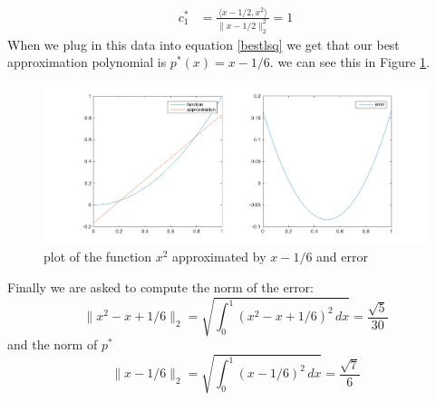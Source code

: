 \begin{solution}
\begin{align*}
c_1^* &= \frac{\langle x-1/2, x^2 \rangle}{\lVert x-1/2\rVert_2^2} = 1
\end{align*}
When we plug in this data into equation \ref{bestlsq} we get that our best approximation polynomial is $p^*(x) = x-1/6$. we can see this in Figure \ref{bestlsqfigure}.
\begin{figure}[h]
\centering 
\includegraphics[scale = 0.25]{bestlsqx2.png}
\caption{ plot of the function $x^2$ approximated by $x-1/6$ and error}
\label{bestlsqfigure}
\end{figure}
Finally we are asked to compute the norm of the error:
\begin{equation*}
\lVert x^2-x+1/6\rVert_2 = \sqrt{\int_0^1 (x^2-x+1/6)^2\, dx}=\frac{\sqrt{5}}{30}
\end{equation*}
and the norm of $p^*$
\begin{equation*}
\lVert x-1/6 \rVert_2 = \sqrt{\int_0^1 (x-1/6)^2 \, dx} = \frac{\sqrt{7}}{6}
\end{equation*}
\end{solution}

